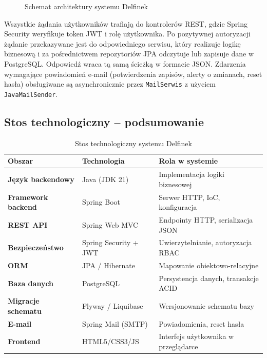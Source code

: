 \documentclass[a4paper,12pt]{article}
\begin{document}
\begin{figure}[H]
\caption{Schemat architektury systemu Delfinek}
\label{fig:architektura}
\end{figure}
 
\noindent Wszystkie żądania użytkowników trafiają do kontrolerów REST, gdzie Spring Security weryfikuje token JWT i rolę użytkownika. Po pozytywnej autoryzacji żądanie przekazywane jest do odpowiedniego serwisu, który realizuje logikę biznesową i za pośrednictwem repozytoriów JPA odczytuje lub zapisuje dane w PostgreSQL. Odpowiedź wraca tą samą ścieżką w formacie JSON. Zdarzenia wymagające powiadomień e-mail (potwierdzenia zapisów, alerty o zmianach, reset hasła) obsługiwane są asynchronicznie przez \texttt{MailSerwis} z użyciem \texttt{JavaMailSender}.
 
\subsection{Stos technologiczny -- podsumowanie}
 
\begin{table}[H]
\centering
\begin{tabular}{>{\bfseries}p{3.8cm} p{4.5cm} p{5.5cm}}
\toprule
Obszar & Technologia & Rola w systemie \\
\midrule
Język backendowy   & Java (JDK 21)         & Implementacja logiki biznesowej \\
Framework backend  & Spring Boot            & Serwer HTTP, IoC, konfiguracja \\
REST API           & Spring Web MVC         & Endpointy HTTP, serializacja JSON \\
Bezpieczeństwo     & Spring Security + JWT  & Uwierzytelnianie, autoryzacja RBAC \\
ORM                & JPA / Hibernate        & Mapowanie obiektowo-relacyjne \\
Baza danych        & PostgreSQL             & Persystencja danych, transakcje ACID \\
Migracje schematu  & Flyway / Liquibase     & Wersjonowanie schematu bazy \\
E-mail             & Spring Mail (SMTP)     & Powiadomienia, reset hasła \\
Frontend           & HTML5/CSS3/JS          & Interfejs użytkownika w przeglądarce \\
\bottomrule
\end{tabular}
\caption{Stos technologiczny systemu Delfinek}
\label{tab:stack}
\end{table}
\end{document}
